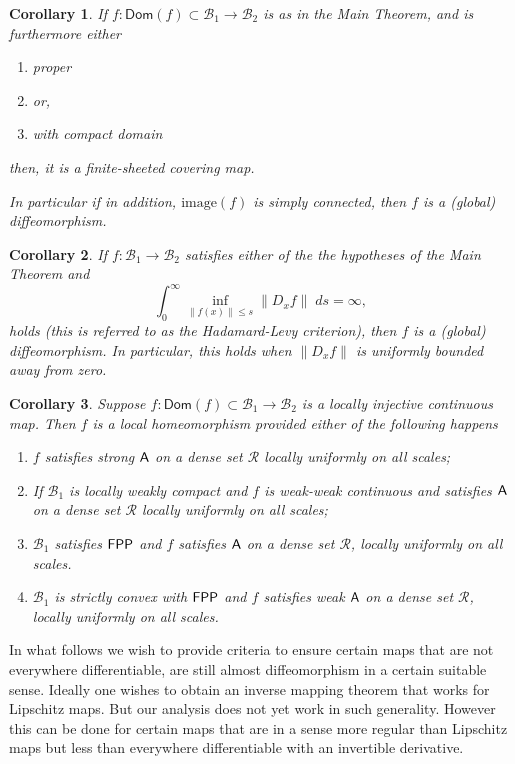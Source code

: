 \documentclass[a4, 12pt,leqno]{amsart}
\theoremstyle{plain}
\newtheorem{corollary}{Corollary}
\theoremstyle{definition}
\theoremstyle{remark}
\numberwithin{equation}{section}
\newcommand{\B}{\mathcal{B}}
\begin{document}
\begin{corollary}\label{corol:main-1}
	If $f: \mathsf{Dom}(f) \subset \B_1 \to \B_2$ is as in the Main Theorem, and is furthermore either
	\begin{enumerate}
		\item proper
		\item[]or,
		\item with compact domain
	\end{enumerate}
	then, it is a finite-sheeted covering map. 
	\par In particular if in addition, $\mathrm{image}(f)$ is simply connected, then $f$ is a (global) diffeomorphism. 
\end{corollary}
\begin{corollary}\label{corol:main-2}
	If $f: \B_1 \to \B_2$ satisfies either of the the hypotheses of the Main Theorem and
	\[
	\int_0^\infty \inf_{\|f(x)\|\le s} \|D_xf\| \; ds = \infty,
	\]
	holds (this is referred to as the Hadamard-Levy criterion), then $f$ is a (global) diffeomorphism. In particular, this holds when $\|D_xf\|$ is uniformly bounded away from zero.  
\end{corollary}
\begin{corollary}\label{corol:main-3}
Suppose $f: \mathsf{Dom}(f) \subset \B_1 \to \B_2$ is a locally injective continuous map. Then $f$ is a local homeomorphism provided either of the following happens
\begin{enumerate}
	\item $f$ satisfies strong ${\sf A}$ on a dense set $\mathcal{R}$ locally uniformly on all scales; 
	\item If $\B_1$ is locally weakly compact and $f$ is weak-weak continuous and satisfies ${\sf A}$ on a dense set $\mathcal{R}$ locally uniformly on all scales; 
	\item $\B_1$ satisfies ${\sf FPP}$ and $f$ satisfies ${\sf A}$ on a dense set $\mathcal{R}$, locally uniformly on all scales.
	\item  $\B_1$ is strictly convex with ${\sf FPP}$ and $f$ satisfies weak ${\sf A}$ on a dense set $\mathcal{R}$, locally uniformly on all scales.
\end{enumerate}
\end{corollary}

\par In what follows we wish to provide criteria to ensure certain maps that are not everywhere differentiable, are still almost diffeomorphism in a certain suitable sense. Ideally one wishes to obtain an inverse mapping theorem that works for Lipschitz maps. But our analysis does not yet work in such generality. However this can be done for certain maps that are in a sense more regular than Lipschitz maps but less than everywhere differentiable with an invertible derivative. 
\end{document}
